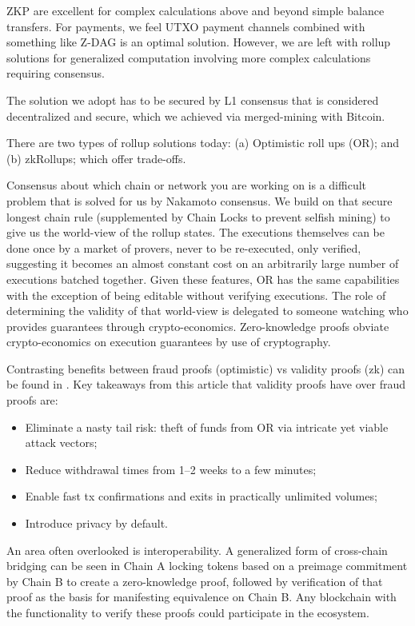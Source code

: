 \documentclass[peerreview]{ieeesyscoin}
\begin{document}
ZKP are excellent for complex calculations above and beyond simple balance transfers. For payments, we feel UTXO payment channels combined with something like Z-DAG is an optimal solution. However, we are left with rollup solutions for generalized computation involving more complex calculations requiring consensus.

The solution we adopt has to be secured by L1 consensus that is considered decentralized and secure, which we achieved via merged-mining with Bitcoin.

There are two types of rollup solutions today: (a) Optimistic roll ups (OR); and (b) zkRollups; which offer trade-offs.

Consensus about which chain or network you are working on is a difficult problem that is solved for us by Nakamoto consensus. We build on that secure longest chain rule (supplemented by Chain Locks to prevent selfish mining) to give us the world-view of the rollup states. The executions themselves can be done once by a market of provers, never to be re-executed, only verified, suggesting it becomes an almost constant cost on an arbitrarily large number of executions batched together. Given these features, OR has the same capabilities with the exception of being editable without verifying executions. The role of determining the validity of that world-view is delegated to someone watching who provides guarantees through crypto-economics. Zero-knowledge proofs obviate crypto-economics on execution guarantees by use of cryptography.

Contrasting benefits between fraud proofs (optimistic) vs validity proofs (zk) can be found in \cite{Sta19}. Key takeaways from this article that validity proofs have over fraud proofs are:

\begin{itemize}
\item Eliminate a nasty tail risk: theft of funds from OR via intricate yet viable attack vectors;
\item Reduce withdrawal times from 1–2 weeks to a few minutes;
\item Enable fast tx confirmations and exits in practically unlimited volumes;
\item Introduce privacy by default.
\end{itemize}

An area often overlooked is interoperability. A generalized form of cross-chain bridging can be seen in Chain A locking tokens based on a preimage commitment by Chain B to create a zero-knowledge proof, followed by verification of that proof as the basis for manifesting equivalence on Chain B. Any blockchain with the functionality to verify these proofs could participate in the ecosystem.
\end{document}
